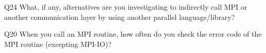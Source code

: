 \begin{description}%
\item{Q24} What, if any, alternatives are you investigating to indirectly call MPI or another communication layer by using another parallel language/library?%
\item{Q20} When you call an MPI routine, how often do you check the error code of the MPI routine  (excepting MPI-IO)?%
\end{description}%
